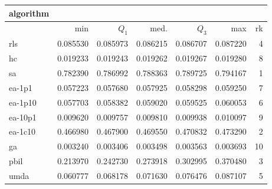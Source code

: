 \begin{tabular}{@{}l*{5}{>{{}}N{1}{3}}>{{}}N{2}{0}@{}}
\toprule
{algorithm} &  \\
\midrule
& {min} & {$Q_1$} & {med.} & {$Q_3$} & {max} & {rk}\\
\midrule
rls & 0.085530 & 0.085973 & 0.086215 & 0.086707 & 0.087220 & 4\\
hc & 0.019233 & 0.019243 & 0.019262 & 0.019267 & 0.019280 & 8\\
sa & {\color{blue}} 0.782390 & {\color{blue}} 0.786992 & {\color{blue}} 0.788363 & {\color{blue}} 0.789725 & {\color{blue}} 0.794167 & 1\\
ea-1p1 & 0.057223 & 0.057680 & 0.057925 & 0.058298 & 0.059250 & 7\\
ea-1p10 & 0.057703 & 0.058382 & 0.059020 & 0.059525 & 0.060053 & 6\\
ea-10p1 & 0.009620 & 0.009757 & 0.009810 & 0.009938 & 0.010097 & 9\\
ea-1c10 & 0.466980 & 0.467900 & 0.469550 & 0.470832 & 0.473290 & 2\\
ga & 0.003240 & 0.003406 & 0.003498 & 0.003563 & 0.003693 & 10\\
pbil & 0.213970 & 0.242730 & 0.273918 & 0.302995 & 0.370480 & 3\\
umda & 0.060777 & 0.068178 & 0.071630 & 0.076476 & 0.087107 & 5\\
\bottomrule
\end{tabular}
